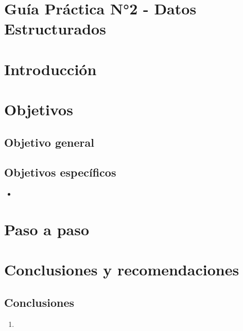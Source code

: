 \documentclass[12pt]{article}
\begin{document}
        

        \tableofcontents
        \newpage

        \section*{\centering Guía Práctica N°2 - Datos Estructurados}

        \section{Introducción}
    
        
        \section{Objetivos}
                \subsection{Objetivo general}
                
                \subsection{Objetivos específicos}
                        \begin{itemize}
                        \item 
                        \end{itemize}


        \section{Paso a paso}
                \subsection{}


        \section{Conclusiones y recomendaciones}
                \subsection{Conclusiones}
                        \begin{enumerate}
                        \item 
                        \end{enumerate}
\end{document}
